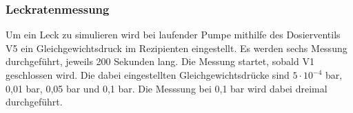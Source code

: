 \subsubsection{Leckratenmessung}
Um ein Leck zu simulieren wird bei laufender Pumpe mithilfe des Dosierventils V5 ein Gleichgewichtsdruck im Rezipienten eingestellt.
Es werden sechs Messung durchgeführt, jeweils 200 Sekunden lang. Die Messung startet, sobald V1 geschlossen wird. Die dabei eingestellten 
Gleichgewichtsdrücke sind $5\cdot 10^{-4}$ bar, 0,01 bar, 0,05 bar und 0,1 bar. Die Messsung bei 0,1 bar wird dabei dreimal durchgeführt.